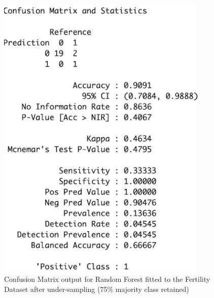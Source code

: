 \begin{figure}[!htbp]
    \centering
    \begin{minipage}{0.45\textwidth}
        \centering
        \includegraphics[width=0.9\textwidth]{ThesisTemplate/appendix/images/Chapter5Appendix/ConfusionMatrix75/Fertility.png}
        \caption{Confusion Matrix output for Random Forest fitted to the Fertility Dataset after under-sampling (75\% majority class retained)}
        \label{fig:matrixFert75}
    \end{minipage}\hfill
    \begin{minipage}{0.45\textwidth}
        \centering

\end{minipage}
\end{figure}
